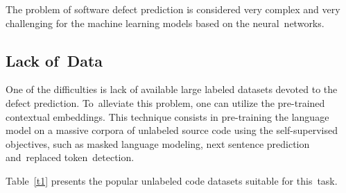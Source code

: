 \documentclass[mathematics,review,accept,moreauthors,pdftex]{Definitions/mdpi}
\begin{document}
The problem of software defect prediction is considered very complex and very challenging for the machine learning models based on the neural~networks. 

\subsection{Lack of~Data}

One of the difficulties is lack of available large labeled datasets devoted to the defect prediction. To~alleviate this problem, one can utilize the pre-trained contextual embeddings. This technique consists in pre-training the language model on a massive corpora of unlabeled source code using the self-supervised objectives, such as masked language modeling, next sentence prediction and~replaced token~detection. 

Table~\ref{t1} presents the popular unlabeled code datasets suitable for this~task.
\end{document}
